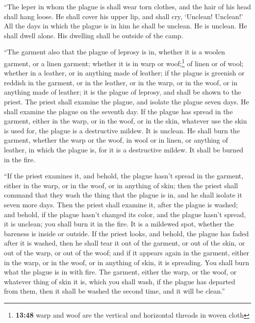  ``The leper in whom the plague is shall wear torn
clothes, and the hair of his head shall hang loose. He shall cover his
upper lip, and shall cry, `Unclean! Unclean!'  All the
days in which the plague is in him he shall be unclean. He is unclean.
He shall dwell alone. His dwelling shall be outside of the camp.

 ``The garment also that the plague of leprosy is in,
whether it is a woolen garment, or a linen garment; 
whether it is in warp or woof;\footnote{\textbf{13:48} warp and woof are
  the vertical and horizontal threads in woven cloth} of linen or of
wool; whether in a leather, or in anything made of leather;
 if the plague is greenish or reddish in the garment, or
in the leather, or in the warp, or in the woof, or in anything made of
leather; it is the plague of leprosy, and shall be shown to the priest.
 The priest shall examine the plague, and isolate the
plague seven days.  He shall examine the plague on the
seventh day. If the plague has spread in the garment, either in the
warp, or in the woof, or in the skin, whatever use the skin is used for,
the plague is a destructive mildew. It is unclean.  He
shall burn the garment, whether the warp or the woof, in wool or in
linen, or anything of leather, in which the plague is, for it is a
destructive mildew. It shall be burned in the fire.

 ``If the priest examines it, and behold, the plague
hasn't spread in the garment, either in the warp, or in the woof, or in
anything of skin;  then the priest shall command that
they wash the thing that the plague is in, and he shall isolate it seven
more days.  Then the priest shall examine it, after the
plague is washed; and behold, if the plague hasn't changed its color,
and the plague hasn't spread, it is unclean; you shall burn it in the
fire. It is a mildewed spot, whether the bareness is inside or outside.
 If the priest looks, and behold, the plague has faded
after it is washed, then he shall tear it out of the garment, or out of
the skin, or out of the warp, or out of the woof;  and if
it appears again in the garment, either in the warp, or in the woof, or
in anything of skin, it is spreading. You shall burn what the plague is
in with fire.  The garment, either the warp, or the woof,
or whatever thing of skin it is, which you shall wash, if the plague has
departed from them, then it shall be washed the second time, and it will
be clean.''

